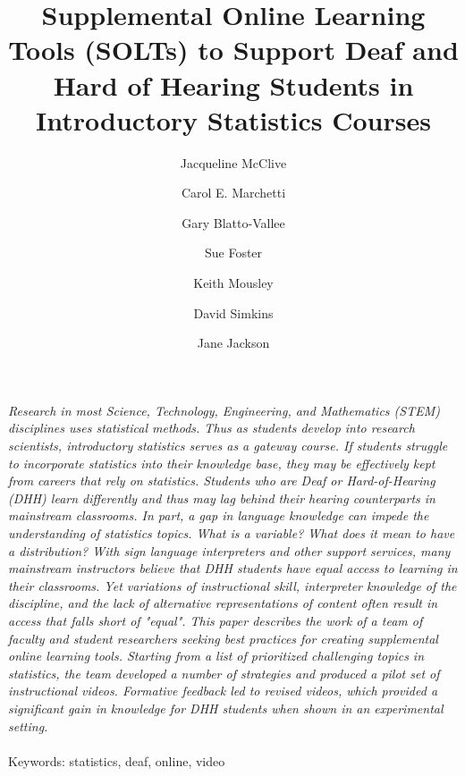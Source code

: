 \documentclass[11.5pt]{sig-alternate} %
\makeatletter
\let\oldabstract\abstract
\let\oldendabstract\endabstract
\renewenvironment{abstract} %
{\renewenvironment{quotation}%
               {\list{}{\addtolength{\leftmargin}{1em} %
                        \listparindent 1.5em%
                        \itemindent    \listparindent%
                        \rightmargin   \leftmargin%
                        \parsep        \z@ \@plus\p@}%
                \item\relax}%
               {\endlist}%
\oldabstract}
{\oldendabstract}
\makeatother
\begin{document}
\title{Supplemental Online Learning Tools (SOLTs) to Support Deaf and Hard of Hearing Students in Introductory Statistics Courses}

\author[1]{\large \color{blue}Jacqueline McClive}
\author[1]{\large \color{blue}Carol E. Marchetti}
\author[1]{\large \color{blue}Gary Blatto-Vallee}
\author[1]{\large \color{blue}Sue Foster}
\author[1]{\large \color{blue}Keith Mousley}
\author[1]{\large \color{blue}David Simkins}
\author[1]{\large \color{blue}Jane Jackson}


\toappear{}
\maketitle
\begin{@twocolumnfalse} 
\begin{abstract}
\item 
\textit {Research in most Science, Technology, Engineering, and Mathematics (STEM) disciplines uses statistical methods. Thus as students develop into research scientists, introductory statistics serves as a gateway course. If students struggle to incorporate statistics into their knowledge base, they may be effectively kept from careers that rely on statistics. Students who are Deaf or Hard-of-Hearing (DHH) learn differently and thus may lag behind their hearing counterparts in mainstream classrooms. In part, a gap in language knowledge can impede the understanding of statistics topics. What is a variable? What does it mean to have a distribution? With sign language interpreters and other support services, many mainstream instructors believe that DHH students have equal access to learning in their classrooms. Yet variations of instructional skill, interpreter knowledge of the discipline, and the lack of alternative representations of content often result in access that falls short of "equal". This paper describes the work of a team of faculty and student researchers seeking best practices for creating supplemental online learning tools. Starting from a list of prioritized challenging topics in statistics, the team developed a number of strategies and produced a pilot set of instructional videos. Formative feedback led to revised videos, which provided a significant gain in knowledge for DHH students when shown in an experimental setting.}
\\ \\
Keywords: statistics, deaf, online, video
\end{abstract}
\end{@twocolumnfalse}
\end{document}
